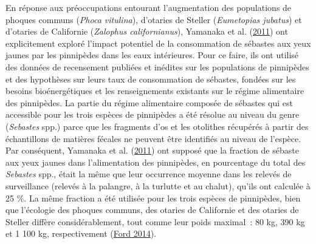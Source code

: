 \documentclass[french,11pt]{book}
\begin{document}
\clearpage

\label{app:pinniped-predation}

En réponse aux préoccupations entourant l'augmentation des populations de phoques communs (\emph{Phoca vitulina}), d'otaries de Steller (\emph{Eumetopias jubatus}) et d'otaries de Californie (\emph{Zalophus californianus}), Yamanaka et al. (\protect\hyperlink{ref-yamanaka2011}{2011}) ont explicitement exploré l'impact potentiel de la consommation de sébastes aux yeux jaunes par les pinnipèdes dans les eaux intérieures. Pour ce faire, ils ont utilisé des données de recensement publiées et inédites sur les populations de pinnipèdes et des hypothèses sur leurs taux de consommation de sébastes, fondées sur les besoins bioénergétiques et les renseignements existants sur le régime alimentaire des pinnipèdes. La partie du régime alimentaire composée de sébastes qui est accessible pour les trois espèces de pinnipèdes a été résolue au niveau du genre (\emph{Sebastes} spp.) parce que les fragments d'os et les otolithes récupérés à partir des échantillons de matières fécales ne peuvent être identifiés au niveau de l'espèce. Par conséquent, Yamanaka et al. (\protect\hyperlink{ref-yamanaka2011}{2011}) ont supposé que la fraction de sébaste aux yeux jaunes dans l'alimentation des pinnipèdes, en pourcentage du total des \emph{Sebastes} spp., était la même que leur occurrence moyenne dans les relevés de surveillance (relevés à la palangre, à la turlutte et au chalut), qu'ils ont calculée à 25 \%. La même fraction a été utilisée pour les trois espèces de pinnipèdes, bien que l'écologie des phoques communs, des otaries de Californie et des otaries de Steller diffère considérablement, tout comme leur poids maximal~: 80 kg, 390 kg et 1 100 kg, respectivement (\protect\hyperlink{ref-ford2014}{Ford 2014}).
\end{document}
